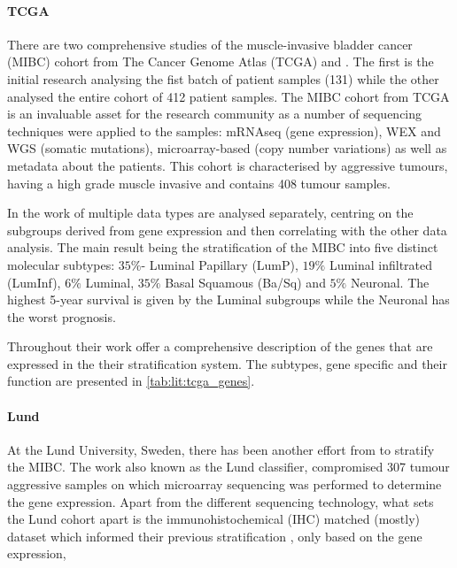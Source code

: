 \paragraph*{TCGA}

There are two comprehensive studies of the muscle-invasive bladder cancer (MIBC) cohort from The Cancer Genome Atlas (TCGA) \citet{Tcga2014-dr} and \citet{Robertson2017-mg}. The first is the initial research analysing the fist batch of patient samples (131) while the other analysed the entire cohort of 412 patient samples. The MIBC cohort from TCGA is an invaluable asset for the research community as a number of sequencing techniques were applied to the samples: mRNAseq (gene expression), WEX and WGS (somatic mutations), microarray-based (copy number variations) as well as metadata about the patients. This cohort is characterised by aggressive tumours, having a high grade muscle invasive and contains 408 tumour samples.

In the work of \citet{Robertson2017-mg} multiple data types are analysed separately, centring on the subgroups derived from gene expression and then correlating with the other data analysis. The main result being the stratification of the MIBC into five distinct molecular subtypes: $35\%$- Luminal Papillary (LumP), $19\%$ Luminal infiltrated (LumInf), $6\%$ Luminal, $35\%$ Basal Squamous (Ba/Sq) and $5\%$ Neuronal. The highest 5-year survival is given by the Luminal subgroups while the Neuronal has the worst prognosis. 

Throughout their work \citet{Robertson2017-mg} offer a comprehensive description of the genes that are expressed in the their stratification system. The subtypes, gene specific and their function are presented in \cref{tab:lit:tcga_genes}.



\paragraph*{Lund}

At the Lund University, Sweden, there has been another effort from \citet{Sjodahl2017-xr,Marzouka2018-ge} to stratify the MIBC. The work also known as the Lund classifier, compromised 307 tumour aggressive samples on which microarray sequencing was performed to determine the gene expression. Apart from the different sequencing technology, what sets the Lund cohort apart is the immunohistochemical (IHC) matched (mostly) dataset which informed their previous stratification \citet{Sjodahl2017-xr}, only based on the gene expression,

